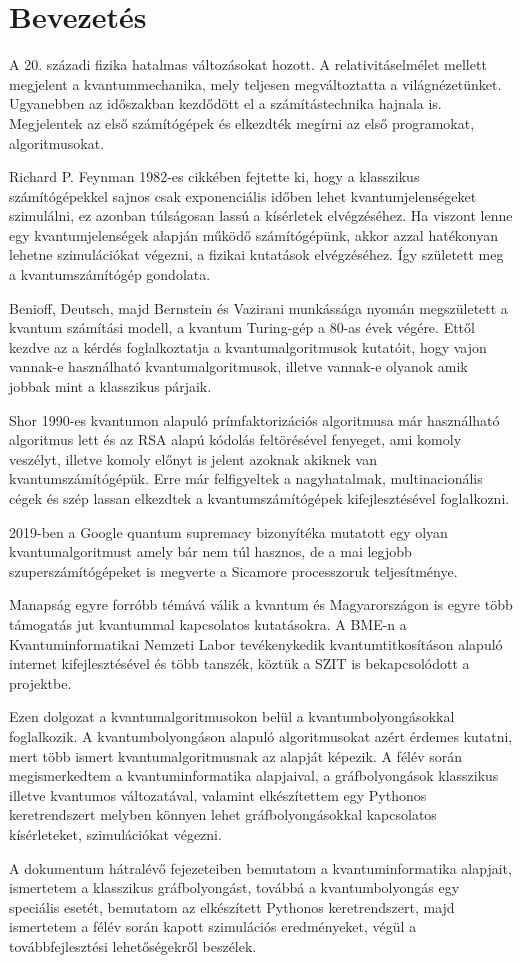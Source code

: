 \chapter{Bevezetés}

A 20. századi fizika hatalmas változásokat hozott. A relativitáselmélet mellett
megjelent a kvantummechanika, mely teljesen megváltoztatta a világnézetünket.
Ugyanebben az időszakban kezdődött el a számítástechnika hajnala is.
Megjelentek az első számítógépek és elkezdték megírni az első programokat,
algoritmusokat.

Richard P. Feynman 1982-es cikkében fejtette ki, hogy a klasszikus
számítógépekkel sajnos csak exponenciális időben lehet kvantumjelenségeket
szimulálni, ez azonban túlságosan lassú a kísérletek elvégzéséhez. Ha viszont
lenne egy kvantumjelenségek alapján működő számítógépünk, akkor azzal
hatékonyan lehetne szimulációkat végezni, a fizikai kutatások elvégzéséhez. Így
született meg a kvantumszámítógép gondolata.

Benioff, Deutsch, majd Bernstein és Vazirani munkássága nyomán megszületett a
kvantum számítási modell, a kvantum Turing-gép a 80-as évek végére. Ettől
kezdve az a kérdés foglalkoztatja a kvantumalgoritmusok kutatóit, hogy vajon
vannak-e használható kvantumalgoritmusok, illetve vannak-e olyanok amik jobbak
mint a klasszikus párjaik.

Shor 1990-es kvantumon alapuló prímfaktorizációs algoritmusa már használható
algoritmus lett és az RSA alapú kódolás feltörésével fenyeget, ami komoly
veszélyt, illetve komoly előnyt is jelent azoknak akiknek van
kvantumszámítógépük. Erre már felfigyeltek a nagyhatalmak, multinacionális
cégek és szép lassan elkezdtek a kvantumszámítógépek kifejlesztésével
foglalkozni.

2019-ben a Google quantum supremacy bizonyítéka mutatott egy olyan
kvantumalgoritmust amely bár nem túl hasznos, de a mai legjobb
szuperszámítógépeket is megverte a Sicamore processzoruk teljesítménye.

Manapság egyre forróbb témává válik a kvantum és Magyarországon is egyre több
támogatás jut kvantummal kapcsolatos kutatásokra. A BME-n a Kvantuminformatikai
Nemzeti Labor tevékenykedik kvantumtitkosításon alapuló internet
kifejlesztésével és több tanszék, köztük a SZIT is bekapcsolódott a projektbe.

Ezen dolgozat a kvantumalgoritmusokon belül a kvantumbolyongásokkal
foglalkozik. A kvantumbolyongáson alapuló algoritmusokat azért érdemes kutatni,
mert több ismert kvantumalgoritmusnak az alapját képezik. A félév során
megismerkedtem a kvantuminformatika alapjaival, a gráfbolyongások klasszikus
illetve kvantumos változatával, valamint elkészítettem egy Pythonos
keretrendszert melyben könnyen lehet gráfbolyongásokkal kapcsolatos
kísérleteket, szimulációkat végezni.

A dokumentum hátralévő fejezeteiben bemutatom a kvantuminformatika alapjait,
ismertetem a klasszikus gráfbolyongást, továbbá a kvantumbolyongás egy
speciális esetét, bemutatom az elkészített Pythonos keretrendszert, majd
ismertetem a félév során kapott szimulációs eredményeket, végül a
továbbfejlesztési lehetőségekről beszélek.